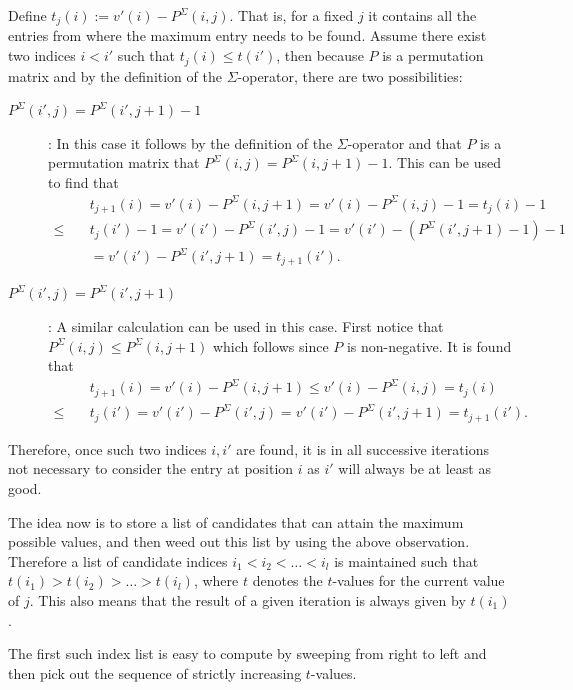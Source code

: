 \documentclass[twoside,11pt,openright]{report}
\begin{document}
Define $t_j(i) := v'(i) - P^{\Sigma}(i, j)$. That is, for a fixed $j$ it contains all the entries from where the maximum entry needs to be found. Assume there exist two indices $i < i'$ such that $t_j(i) \leq t(i')$, then because $P$ is a permutation matrix and by the definition of the $\Sigma$-operator, there are two possibilities:
\begin{description}
  \item[$P^{\Sigma}(i', j) = P^{\Sigma}(i', j + 1) - 1$]: In this case it follows by the definition of the $\Sigma$-operator and that $P$ is a permutation matrix that $P^{\Sigma}(i, j) = P^{\Sigma}(i, j + 1) - 1$.  This can be used to find that
  \begin{align*}
    &t_{j + 1}(i) = v'(i) - P^{\Sigma}(i, j + 1) = v'(i) - P^{\Sigma}(i, j) - 1
      = t_{j}(i) - 1 \\
      \leq\quad &t_j(i') - 1 = v'(i') - P^{\Sigma}(i', j) - 1
      = v'(i') - (P^{\Sigma}(i', j + 1) - 1) - 1 \\
      &= v'(i') - P^{\Sigma}(i', j + 1) = t_{j + 1}(i').
  \end{align*}

  \item[$P^{\Sigma}(i', j) = P^{\Sigma}(i', j + 1)$]: A similar calculation can be used in this case. First notice that $P^{\Sigma}(i, j) \leq P^{\Sigma}(i, j + 1)$ which follows since $P$ is non-negative. It is found that
  \begin{align*}
    &t_{j + 1}(i) = v'(i) - P^{\Sigma}(i, j + 1) \leq v'(i) - P^{\Sigma}(i, j) = t_{j}(i) \\
      \leq\quad &t_j(i') = v'(i') - P^{\Sigma}(i', j) = v'(i') - P^{\Sigma}(i', j + 1) = t_{j + 1}(i').
  \end{align*}
\end{description}
%
Therefore, once such two indices $i,i'$ are found, it is in all successive iterations not necessary to consider the entry at position $i$ as $i'$ will always be at least as good.

The idea now is to store a list of candidates that can attain the maximum possible values, and then weed out this list by using the above observation. Therefore a list of candidate indices $i_1 < i_2 < \dots < i_l$ is maintained such that $t(i_1) > t(i_2) > \dots > t(i_l)$, where $t$ denotes the $t$-values for the current value of $j$. This also means that the result of a given iteration is always given by $t(i_1)$.

The first such index list is easy to compute by sweeping from right to left and then pick out the sequence of strictly increasing $t$-values.
\end{document}
